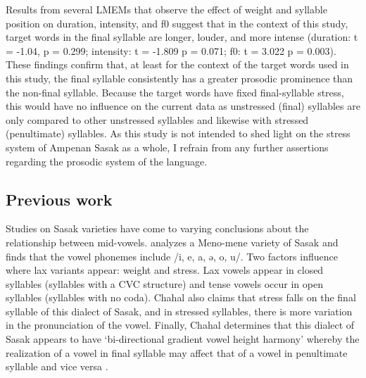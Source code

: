 \documentclass[12pt]{ouparticle}
\begin{document}
Results from several LMEMs that observe the effect of weight and syllable position on duration, intensity, and f0 suggest that in the context of this study, target words in the final syllable are longer, louder, and more intense (duration: t = -1.04, p = 0.299; intensity: t = -1.809 p = 0.071; f0: t = 3.022 p = 0.003). These findings confirm that, at least for the context of the target words used in this study, the final syllable consistently has a greater prosodic prominence than the non-final syllable. Because the target words have fixed final-syllable stress, this would have no influence on the current data as unstressed (final) syllables are only compared to other unstressed syllables and likewise with stressed (penultimate) syllables. As this study is not intended to shed light on the stress system of Ampenan Sasak as a whole, I refrain from any further assertions regarding the prosodic system of the language.  





\subsection{Previous work}

Studies on Sasak varieties have come to varying conclusions about the relationship between mid-vowels. \citet[5]{chahal1998} analyzes a Meno-mene variety of Sasak and finds that the vowel phonemes include /i, e, a, ə, o, u/. Two factors influence where lax variants appear: weight and stress. Lax vowels appear in closed syllables (syllables with a CVC structure) and tense vowels occur in open syllables (syllables with no coda). Chahal also claims that stress falls on the final syllable of this dialect of Sasak, and in stressed syllables, there is more variation in the pronunciation of the vowel. Finally, Chahal determines that this dialect of Sasak appears to have `bi-directional gradient vowel height harmony' whereby the realization of a vowel in final syllable may affect that of a vowel in penultimate syllable and vice versa \citep[11-12]{chahal1998}.
\end{document}
